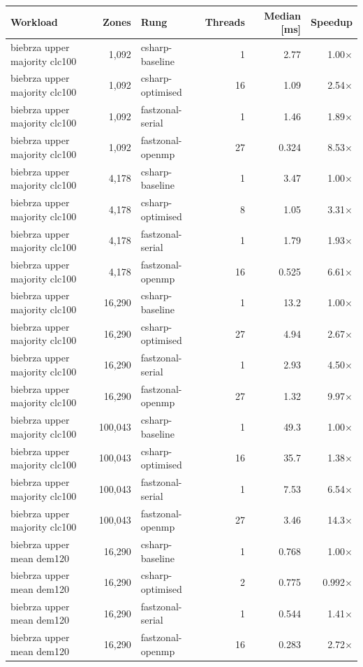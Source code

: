 \begin{tabular}{lrlrrr}
\toprule
Workload & Zones & Rung & Threads & Median [ms] & Speedup \\
\midrule
biebrza upper majority clc100 & 1,092 & csharp-baseline & 1 & 2.77 & 1.00$\times$ \\
biebrza upper majority clc100 & 1,092 & csharp-optimised & 16 & 1.09 & 2.54$\times$ \\
biebrza upper majority clc100 & 1,092 & fastzonal-serial & 1 & 1.46 & 1.89$\times$ \\
biebrza upper majority clc100 & 1,092 & fastzonal-openmp & 27 & 0.324 & 8.53$\times$ \\
biebrza upper majority clc100 & 4,178 & csharp-baseline & 1 & 3.47 & 1.00$\times$ \\
biebrza upper majority clc100 & 4,178 & csharp-optimised & 8 & 1.05 & 3.31$\times$ \\
biebrza upper majority clc100 & 4,178 & fastzonal-serial & 1 & 1.79 & 1.93$\times$ \\
biebrza upper majority clc100 & 4,178 & fastzonal-openmp & 16 & 0.525 & 6.61$\times$ \\
biebrza upper majority clc100 & 16,290 & csharp-baseline & 1 & 13.2 & 1.00$\times$ \\
biebrza upper majority clc100 & 16,290 & csharp-optimised & 27 & 4.94 & 2.67$\times$ \\
biebrza upper majority clc100 & 16,290 & fastzonal-serial & 1 & 2.93 & 4.50$\times$ \\
biebrza upper majority clc100 & 16,290 & fastzonal-openmp & 27 & 1.32 & 9.97$\times$ \\
biebrza upper majority clc100 & 100,043 & csharp-baseline & 1 & 49.3 & 1.00$\times$ \\
biebrza upper majority clc100 & 100,043 & csharp-optimised & 16 & 35.7 & 1.38$\times$ \\
biebrza upper majority clc100 & 100,043 & fastzonal-serial & 1 & 7.53 & 6.54$\times$ \\
biebrza upper majority clc100 & 100,043 & fastzonal-openmp & 27 & 3.46 & 14.3$\times$ \\
biebrza upper mean dem120 & 16,290 & csharp-baseline & 1 & 0.768 & 1.00$\times$ \\
biebrza upper mean dem120 & 16,290 & csharp-optimised & 2 & 0.775 & 0.992$\times$ \\
biebrza upper mean dem120 & 16,290 & fastzonal-serial & 1 & 0.544 & 1.41$\times$ \\
biebrza upper mean dem120 & 16,290 & fastzonal-openmp & 16 & 0.283 & 2.72$\times$ \\

\end{tabular}
